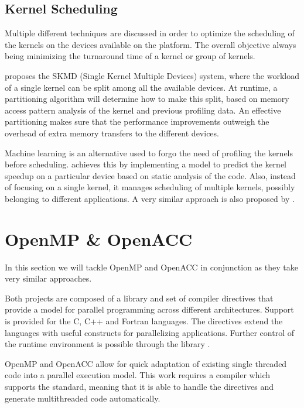 \subsection{Kernel Scheduling} \label{sub-sect:kernel_scheduling}
Multiple different techniques are discussed in order to optimize the scheduling of the kernels on the devices available on the platform. The overall objective always being minimizing the turnaround time of a kernel or group of kernels.

\cite{transparent_cpu_gpu_collaboration} proposes the SKMD (Single Kernel Multiple Devices) system, where the workload of a single kernel can be split among all the available devices. At runtime, a partitioning algorithm will determine how to make this split, based on memory access pattern analysis of the kernel and previous profiling data. An effective partitioning makes sure that the performance improvements outweigh the overhead of extra memory transfers to the different devices. 

Machine learning is an alternative used to forgo the need of profiling the kernels before scheduling. \cite{smart_multitasking_scheduling} achieves this by implementing a model to predict the kernel speedup on a particular device based on static analysis of the code. Also, instead of focusing on a single kernel, it manages scheduling of multiple kernels, possibly belonging to different applications. A very similar approach is also proposed by \cite{load_balance_model_opencl_integrated_cluster}.

\section{OpenMP \& OpenACC}
In this section we will tackle OpenMP and OpenACC in conjunction as they take very similar approaches.

Both projects are composed of a library and set of compiler directives that provide a model for parallel programming across different architectures. Support is provided for the C, C++ and Fortran languages. The directives extend the languages with useful constructs for parallelizing applications. Further control of the runtime environment is possible through the library \cite{openmp_spec, openacc_spec}.

OpenMP and OpenACC allow for quick adaptation of existing single threaded code into a parallel execution model. This work requires a compiler which supports the standard, meaning that it is able to handle the directives and generate multithreaded code automatically. 

